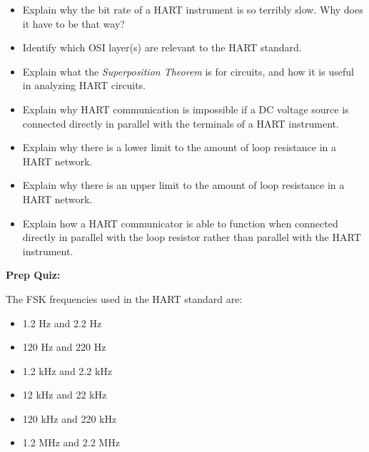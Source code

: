 \begin{itemize}
\item{} Explain why the bit rate of a HART instrument is so terribly slow.  Why does it have to be that way?
\item{} Identify which OSI layer(s) are relevant to the HART standard.
\item{} Explain what the {\it Superposition Theorem} is for circuits, and how it is useful in analyzing HART circuits.
\item{} Explain why HART communication is impossible if a DC voltage source is connected directly in parallel with the terminals of a HART instrument.
\item{} Explain why there is a lower limit to the amount of loop resistance in a HART network.
\item{} Explain why there is an upper limit to the amount of loop resistance in a HART network.
\item{} Explain how a HART communicator is able to function when connected directly in parallel with the loop resistor rather than parallel with the HART instrument.
\end{itemize}












\vfil \eject

\noindent
{\bf Prep Quiz:}

The FSK frequencies used in the HART standard are:

\begin{itemize}
\item{} 1.2 Hz and 2.2 Hz
\vskip 5pt 
\item{} 120 Hz and 220 Hz
\vskip 5pt 
\item{} 1.2 kHz and 2.2 kHz 
\vskip 5pt 
\item{} 12 kHz and 22 kHz
\vskip 5pt 
\item{} 120 kHz and 220 kHz
\vskip 5pt 
\item{} 1.2 MHz and 2.2 MHz
\end{itemize}



